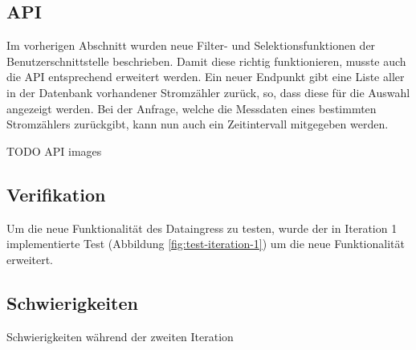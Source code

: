 \subsection{\ac{API}}
Im vorherigen Abschnitt wurden neue Filter- und Selektionsfunktionen der Benutzerschnittstelle beschrieben.
Damit diese richtig funktionieren, musste auch die \ac{API} entsprechend erweitert werden.
Ein neuer Endpunkt gibt eine Liste aller in der Datenbank vorhandener Stromzähler zurück, so, dass diese für die Auswahl angezeigt werden.
Bei der Anfrage, welche die Messdaten eines bestimmten Stromzählers zurückgibt, kann nun auch ein Zeitintervall mitgegeben werden.

TODO API images


\subsection{Verifikation}

Um die neue Funktionalität des Dataingress zu testen, wurde der in Iteration 1
implementierte Test (Abbildung \ref{fig:test-iteration-1}) um die neue Funktionalität
erweitert.

\subsection{Schwierigkeiten}
Schwierigkeiten während der zweiten Iteration
